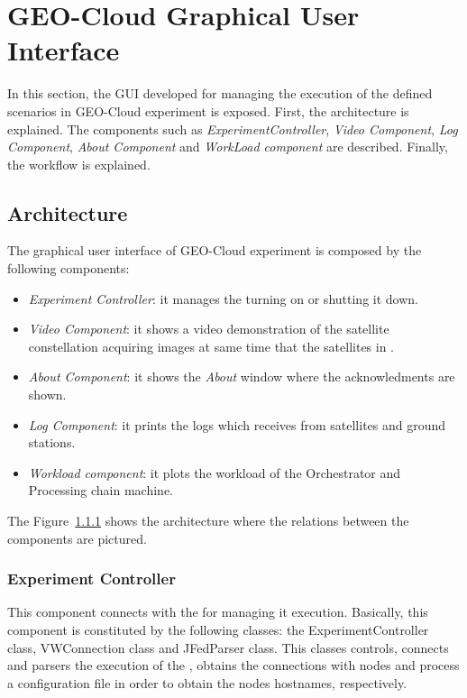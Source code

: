 \section{GEO-Cloud Graphical User Interface}
\label{sec:interfaz}
In this section, the \ac{GUI} developed for managing the execution of the defined
scenarios in GEO-Cloud experiment is exposed. First, the architecture is
explained. The components such as \emph{ExperimentController}, \emph{Video
  Component}, \emph{Log Component}, \emph{About Component} and \emph{WorkLoad component} are described. Finally, the workflow is explained.

\subsection{Architecture}

The graphical user interface of GEO-Cloud experiment is composed by the following components:

\begin{itemize}

\item \emph{Experiment Controller}: it manages the \sss turning on or shutting it down.
\item \emph{Video Component}: it shows a video demonstration of the satellite constellation acquiring images at same time that the satellites in \vw.
\item \emph{About Component}: it shows the \emph{About} window where the acknowledments are shown.
\item \emph{Log Component}: it prints the logs which receives from satellites and ground stations.
\item \emph{Workload component}: it plots the workload of the Orchestrator and Processing chain machine.

\end{itemize}

The Figure~\ref{} shows the architecture where the relations between the components are pictured.


\subsubsection{Experiment Controller}

This component connects with the \sss for managing it execution. Basically, this component is constituted by the following classes: the ExperimentController class, VWConnection class and JFedParser class. This classes controls, connects and parsers the execution of the \sss, obtains the connections with \sss nodes and process a configuration file in order to obtain the \sss nodes hostnames, respectively.

